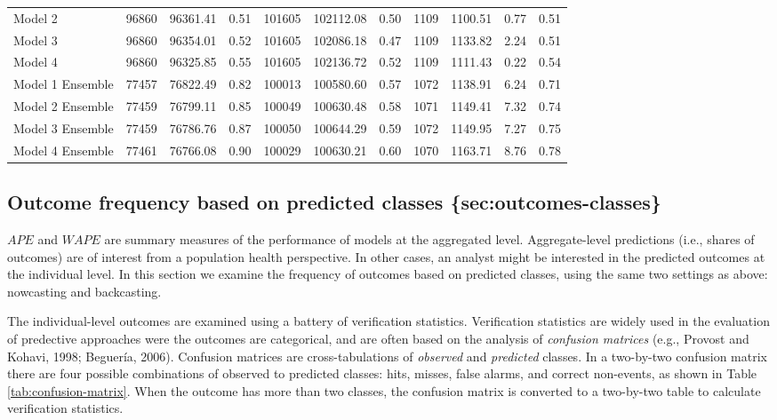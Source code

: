 \documentclass[]{elsarticle} %
\begin{document}
\begin{table}
\begin{tabular}[t]{lrrrrrrrrrr}
\rowcolor{gray!15}
\hspace{1em}Model 2 & 96860 & 96361.41 & 0.51 & 101605 & 102112.08 & 0.50 & 1109 & 1100.51 & 0.77 & 0.51\\
\hspace{1em}Model 3 & 96860 & 96354.01 & 0.52 & 101605 & 102086.18 & 0.47 & 1109 & 1133.82 & 2.24 & 0.51\\
\rowcolor{gray!15}
\hspace{1em}Model 4 & 96860 & 96325.85 & 0.55 & 101605 & 102136.72 & 0.52 & 1109 & 1111.43 & 0.22 & 0.54\\
\hspace{1em}Model 1 Ensemble & 77457 & 76822.49 & 0.82 & 100013 & 100580.60 & 0.57 & 1072 & 1138.91 & 6.24 & 0.71\\
\rowcolor{gray!15}
\hspace{1em}Model 2 Ensemble & 77459 & 76799.11 & 0.85 & 100049 & 100630.48 & 0.58 & 1071 & 1149.41 & 7.32 & 0.74\\
\hspace{1em}Model 3 Ensemble & 77459 & 76786.76 & 0.87 & 100050 & 100644.29 & 0.59 & 1072 & 1149.95 & 7.27 & 0.75\\
\rowcolor{gray!15}
Model 4 Ensemble & 77461 & 76766.08 & 0.90 & 100029 & 100630.21 & 0.60 & 1070 & 1163.71 & 8.76 & 0.78\\
\bottomrule
\end{tabular}
\end{table}

\hypertarget{outcome-frequency-based-on-predicted-classes-secoutcomes-classes}{%
\subsection{Outcome frequency based on predicted classes
\{sec:outcomes-classes\}}\label{outcome-frequency-based-on-predicted-classes-secoutcomes-classes}}

\(APE\) and \(WAPE\) are summary measures of the performance of models
at the aggregated level. Aggregate-level predictions (i.e., shares of
outcomes) are of interest from a population health perspective. In other
cases, an analyst might be interested in the predicted outcomes at the
individual level. In this section we examine the frequency of outcomes
based on predicted classes, using the same two settings as above:
nowcasting and backcasting.

The individual-level outcomes are examined using a battery of
verification statistics. Verification statistics are widely used in the
evaluation of predective approaches were the outcomes are categorical,
and are often based on the analysis of \emph{confusion matrices} (e.g.,
Provost and Kohavi, 1998; Beguería, 2006). Confusion matrices are
cross-tabulations of \emph{observed} and \emph{predicted} classes. In a
two-by-two confusion matrix there are four possible combinations of
observed to predicted classes: hits, misses, false alarms, and correct
non-events, as shown in Table \ref{tab:confusion-matrix}. When the
outcome has more than two classes, the confusion matrix is converted to
a two-by-two table to calculate verification statistics.
\end{document}
